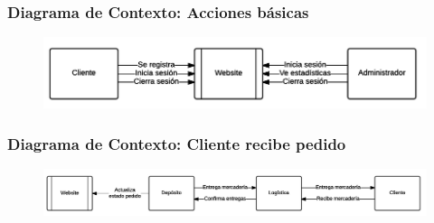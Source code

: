 \subsubsection{Diagrama de Contexto: Acciones básicas}
\begin{figure}[H]
  \includegraphics[width=\linewidth]{images/acciones-basicas.png}
\end{figure}

\clearpage
\subsubsection{Diagrama de Contexto: Cliente recibe pedido}
\begin{figure}[H]
  \includegraphics[width=\linewidth]{images/cliente-recibe-pedido.png}
\end{figure}

\clearpage
